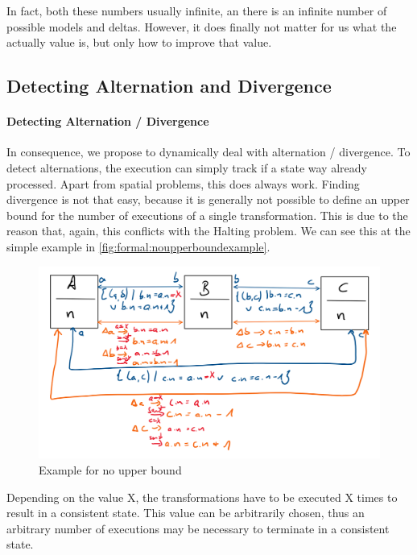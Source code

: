 In fact, both these numbers usually infinite, an there is an infinite number of possible models and deltas. However, it does finally not matter for us what the actually value is, but only how to improve that value.


\subsection{Detecting Alternation and Divergence}

\paragraph{Detecting Alternation / Divergence}

In consequence, we propose to dynamically deal with alternation / divergence.
To detect alternations, the execution can simply track if a state way already processed. Apart from spatial problems, this does always work.
Finding divergence is not that easy, because it is generally not possible to define an upper bound for the number of executions of a single transformation.
This is due to the reason that, again, this conflicts with the Halting problem.
We can see this at the simple example in \autoref{fig:formal:noupperboundexample}.

\begin{figure}
    \centering
    \includegraphics[width=\textwidth]{figures/correctness/orchestration/no_upper_bound_example_old.png}
    \caption{Example for no upper bound}
    \label{fig:formal:noupperboundexample}
\end{figure}

Depending on the value X, the transformations have to be executed X times to result in a consistent state. This value can be arbitrarily chosen, thus an arbitrary number of executions may be necessary to terminate in a consistent state.

